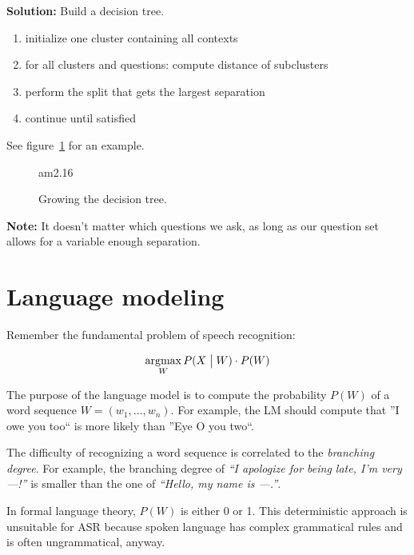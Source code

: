 \documentclass[11pt]{article}
\DeclareMathOperator*{\argmax}{\arg\!\max}
\begin{document}
\textbf{Solution:} Build a decision tree.

\vspace{10pt}

\begin{enumerate}
    \item initialize one cluster containing all contexts
    \item for all clusters and questions: compute distance of subclusters
    \item perform the split that gets the largest separation
    \item continue until satisfied
\end{enumerate}

See figure~\ref{fig:growDecisionTree} for an example.

\begin{figure}[htb]
    \begin{minipage}{\linewidth}
        \vspace{5cm}
        \hfill \scriptsize am2.16
    \end{minipage}
    \caption{\label{fig:growDecisionTree} Growing the decision tree.}
\end{figure}

\textbf{Note:} It doesn't matter which questions we ask, as long as our question set allows for a variable enough separation.

\newpage

\section{Language modeling}

Remember the fundamental problem of speech recognition:

\[
    \argmax_W P(X \bigm| W) \cdot P(W)
\]

The purpose of the language model is to compute the probability $P(W)$ of a word sequence $W = (w_1, \ldots, w_n)$. For example, the LM should compute that ''I owe you too`` is more likely than ''Eye O you two``.

The difficulty of recognizing a word sequence is correlated to the \textit{branching degree}. For example, the branching degree of \textit{``I apologize for being late, I'm very ---!''} is smaller than the one of \textit{``Hello, my name is ---.''}.

In formal language theory, $P(W)$ is either 0 or 1. This deterministic approach is unsuitable for ASR because spoken language has complex grammatical rules and is often ungrammatical, anyway.
\end{document}
